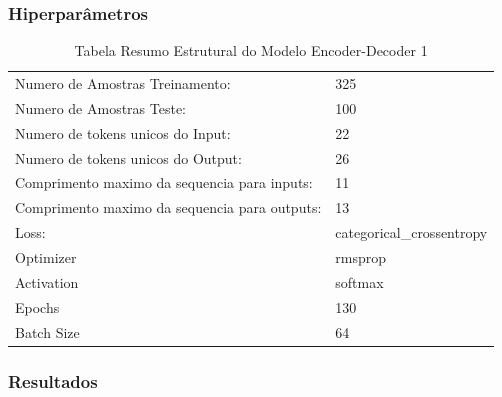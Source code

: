 \subsubsection{Hiperparâmetros} 

\begin{table}[H]
\centering
\begin{tabular}{ll}
Numero de Amostras Treinamento: & 325 \\
Numero de Amostras Teste: & 100 \\
Numero de tokens unicos do Input: & 22 \\
Numero de tokens unicos do Output: & 26 \\
Comprimento maximo da sequencia para inputs: & 11 \\
Comprimento maximo da sequencia para outputs: & 13 \\
Loss: & categorical\_crossentropy \\
Optimizer & rmsprop \\
Activation & softmax \\
Epochs & 130 \\
Batch Size & 64
\end{tabular}
\caption{Tabela Resumo Estrutural do Modelo Encoder-Decoder 1}
\label{tab:res1}
\end{table}

\subsubsection{Resultados}

